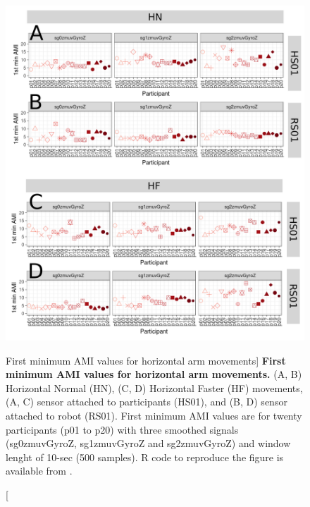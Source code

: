 \begin{figure}
\centering
\includegraphics[width=1.0\textwidth]{ami_aHw10}
	\caption
	[First minimum AMI values for horizontal arm movements]{
	{\bf First minimum AMI values for horizontal arm movements.}
		(A, B) Horizontal Normal (HN), (C, D) Horizontal Faster (HF) 
		movements,
		(A, C) sensor attached to participants (HS01), and
		(B, D) sensor attached to robot (RS01).
		First minimum AMI values are for twenty participants 
		(p01 to p20) with three smoothed signals (sg0zmuvGyroZ, 
		sg1zmuvGyroZ and sg2zmuvGyroZ) and  window lenght of 
		10-sec (500 samples).
		R code to reproduce the figure is available 
		from \cite{xochicale2018}.
        }
    \label{fig:amiH}
\end{figure}

